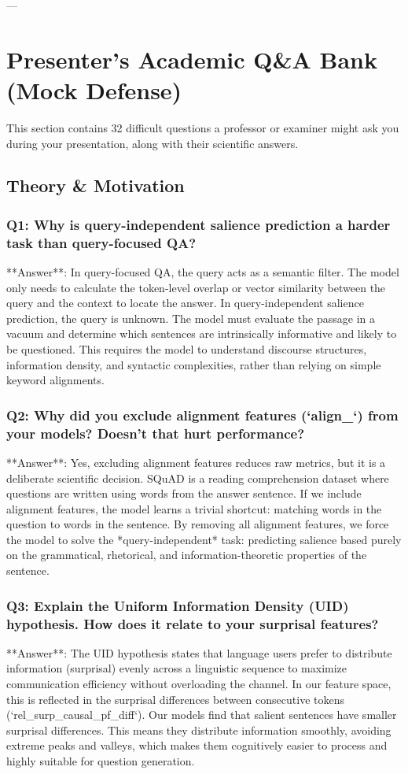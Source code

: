\documentclass[11pt,a4paper]{article}
\begin{document}
---

\section{Presenter's Academic Q\&A Bank (Mock Defense)}

This section contains 32 difficult questions a professor or examiner might ask you during your presentation, along with their scientific answers.

\subsection{Theory \& Motivation}

\subsubsection{Q1: Why is query-independent salience prediction a harder task than query-focused QA?}
**Answer**: In query-focused QA, the query acts as a semantic filter. The model only needs to calculate the token-level overlap or vector similarity between the query and the context to locate the answer. 
In query-independent salience prediction, the query is unknown. The model must evaluate the passage in a vacuum and determine which sentences are intrinsically informative and likely to be questioned. This requires the model to understand discourse structures, information density, and syntactic complexities, rather than relying on simple keyword alignments.

\subsubsection{Q2: Why did you exclude alignment features (`align\_`) from your models? Doesn't that hurt performance?}
**Answer**: Yes, excluding alignment features reduces raw metrics, but it is a deliberate scientific decision. SQuAD is a reading comprehension dataset where questions are written using words from the answer sentence. If we include alignment features, the model learns a trivial shortcut: matching words in the question to words in the sentence. 
By removing all alignment features, we force the model to solve the *query-independent* task: predicting salience based purely on the grammatical, rhetorical, and information-theoretic properties of the sentence.

\subsubsection{Q3: Explain the Uniform Information Density (UID) hypothesis. How does it relate to your surprisal features?}
**Answer**: The UID hypothesis states that language users prefer to distribute information (surprisal) evenly across a linguistic sequence to maximize communication efficiency without overloading the channel. 
In our feature space, this is reflected in the surprisal differences between consecutive tokens (`rel\_surp\_causal\_pf\_diff`). Our models find that salient sentences have smaller surprisal differences. This means they distribute information smoothly, avoiding extreme peaks and valleys, which makes them cognitively easier to process and highly suitable for question generation.
\end{document}
